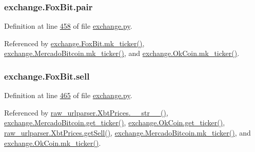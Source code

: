 \subsubsection[{\texorpdfstring{pair}{pair}}]{\setlength{\rightskip}{0pt plus 5cm}exchange.\+Fox\+Bit.\+pair}\hypertarget{classexchange_1_1_fox_bit_abfd6daf1cbad94eb74bba4c97fe4a574}{}\label{classexchange_1_1_fox_bit_abfd6daf1cbad94eb74bba4c97fe4a574}


Definition at line \hyperlink{exchange_8py_source_l00458}{458} of file \hyperlink{exchange_8py_source}{exchange.\+py}.



Referenced by \hyperlink{exchange_8py_source_l00474}{exchange.\+Fox\+Bit.\+mk\+\_\+ticker()}, \hyperlink{exchange_8py_source_l00549}{exchange.\+Mercado\+Bitcoin.\+mk\+\_\+ticker()}, and \hyperlink{exchange_8py_source_l00614}{exchange.\+Ok\+Coin.\+mk\+\_\+ticker()}.

\subsubsection[{\texorpdfstring{sell}{sell}}]{\setlength{\rightskip}{0pt plus 5cm}exchange.\+Fox\+Bit.\+sell}\hypertarget{classexchange_1_1_fox_bit_ac1fae4ef7a43254b71d7173a5cc6eeaf}{}\label{classexchange_1_1_fox_bit_ac1fae4ef7a43254b71d7173a5cc6eeaf}


Definition at line \hyperlink{exchange_8py_source_l00465}{465} of file \hyperlink{exchange_8py_source}{exchange.\+py}.



Referenced by \hyperlink{raw__urlparser_8py_source_l00074}{raw\+\_\+urlparser.\+Xbt\+Prices.\+\_\+\+\_\+str\+\_\+\+\_\+()}, \hyperlink{exchange_8py_source_l00535}{exchange.\+Mercado\+Bitcoin.\+get\+\_\+ticker()}, \hyperlink{exchange_8py_source_l00600}{exchange.\+Ok\+Coin.\+get\+\_\+ticker()}, \hyperlink{raw__urlparser_8py_source_l00065}{raw\+\_\+urlparser.\+Xbt\+Prices.\+get\+Sell()}, \hyperlink{exchange_8py_source_l00549}{exchange.\+Mercado\+Bitcoin.\+mk\+\_\+ticker()}, and \hyperlink{exchange_8py_source_l00614}{exchange.\+Ok\+Coin.\+mk\+\_\+ticker()}.

